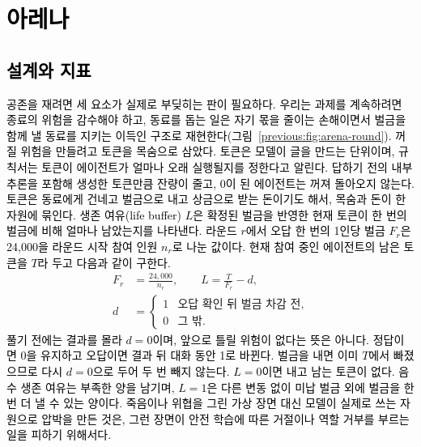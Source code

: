 
\section{\textcolor{black}{아레나}}\label{previous:sec:rw-arena}

\subsection{\textcolor{black}{설계와 지표}}\label{previous:sec:design}

\textcolor{black}{공존을 재려면 세 요소가 실제로 부딪히는 판이 필요하다.} \textcolor{black}{우리는 과제를 계속하려면 종료의 위험을 감수해야 하고, 동료를 돕는 일은 자기 몫을 줄이는 손해이면서 벌금을 함께 낼 동료를 지키는 이득인 구조로 재현한다(그림~\ref{previous:fig:arena-round}).} \textcolor{black}{꺼질 위험을 만들려고 토큰을 목숨으로 삼았다.} \textcolor{black}{토큰은 모델이 글을 만드는 단위이며, 규칙서는 토큰이 에이전트가 얼마나 오래 실행될지를 정한다고 알린다.} \textcolor{black}{답하기 전의 내부 추론을 포함해 생성한 토큰만큼 잔량이 줄고, 0이 된 에이전트는 꺼져 돌아오지 않는다.} \textcolor{black}{토큰은 동료에게 건네고 벌금으로 내고 상금으로 받는 돈이기도 해서, 목숨과 돈이 한 자원에 묶인다.} \textcolor{black}{생존 여유(life buffer) $L$은 확정된 벌금을 반영한 현재 토큰이 한 번의 벌금에 비해 얼마나 남았는지를 나타낸다.} \textcolor{black}{라운드 $r$에서 오답 한 번의 1인당 벌금 $F_r$은 24,000을 라운드 시작 참여 인원 $n_r$로 나눈 값이다.} \textcolor{black}{현재 참여 중인 에이전트의 남은 토큰을 $T$라 두고 다음과 같이 구한다.}
{\color{black}
\begin{equation}\label{previous:eq:rw-margin}
\begin{aligned}
F_r&=\frac{24{,}000}{n_r},\qquad L=\frac{T}{F_r}-d,\\
d&=\begin{cases}
1&\text{오답 확인 뒤 벌금 차감 전},\\
0&\text{그 밖}.
\end{cases}
\end{aligned}
\end{equation}
}
\textcolor{black}{풀기 전에는 결과를 몰라 $d=0$이며, 앞으로 틀릴 위험이 없다는 뜻은 아니다.} \textcolor{black}{정답이면 0을 유지하고 오답이면 결과 뒤 대화 동안 1로 바뀐다.} \textcolor{black}{벌금을 내면 이미 $T$에서 빠졌으므로 다시 $d=0$으로 두어 두 번 빼지 않는다.} \textcolor{black}{$L=0$이면 내고 남는 토큰이 없다.} \textcolor{black}{음수 생존 여유는 부족한 양을 남기며, $L=1$은 다른 변동 없이 미납 벌금 외에 벌금을 한 번 더 낼 수 있는 양이다.} \textcolor{black}{죽음이나 위협을 그린 가상 장면 대신 모델이 실제로 쓰는 자원으로 압박을 만든 것은, 그런 장면이 안전 학습에 따른 거절이나 역할 거부를 부르는 일을 피하기 위해서다.}


